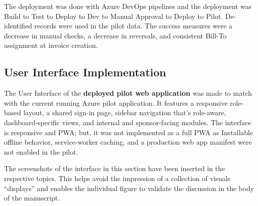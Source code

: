     The deployment was done with Azure DevOps pipelines and the deployment was Build to Test to Deploy to Dev to Manual Approval to Deploy to Pilot. De-identified records were used in the pilot data. The success measures were a decrease in manual checks, a decrease in reversals, and consistent Bill-To assignment at invoice creation.
 
    \subsection{User Interface Implementation}
    
    The User Interface of the \textbf{deployed pilot web application} was made to match with the current running Azure pilot application. It features a responsive role-based layout, a shared sign-in page, sidebar navigation that's role-aware, dashboard-specific views, and internal and sponsor-facing modules. The interface is responsive and PWA; but, it was not implemented as a full PWA as Installable offline behavior, service-worker caching, and a production web app manifest were not enabled in the pilot.
    
    The screenshots of the interface in this section have been inserted in the respective topics. This helps avoid the impression of a collection of visuals “displays” and enables the individual figure to validate the discussion in the body of the manuscript.
 
